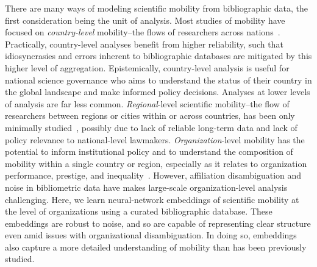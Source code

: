 \documentclass[12pt]{article} %
\begin{document}
There are many ways of modeling scientific mobility from bibliographic data, the first consideration being the unit of analysis. 
Most studies of mobility have focused on \textit{country-level} mobility--the flows of researchers across nations~\autocite{sugimoto2017mostimpact, scellato2015migrant, robinson-garcia2018indicators, franzoni2012foreign-born}.
Practically, country-level analyses benefit from higher reliability, such that idiosyncrasies and errors inherent to bibliographic databases are mitigated by this higher level of aggregation.
Epistemically, country-level analysis is useful for national science governance who aims to understand the status of their country in the global landscape and make informed policy decisions. 
Analyses at lower levels of analysis are far less common. 
\textit{Regional}-level scientific mobility--the flow of researchers between regions or cities within or across countries, has been only minimally studied~\autocite{vaccario2019mobility}, possibly due to lack of reliable long-term data and lack of policy relevance to national-level lawmakers. 
\textit{Organization}-level mobility has the potential to inform institutional policy and to understand the composition of mobility within a single country or region, especially as it relates to organization performance, prestige, and inequality~\autocite{albarran2017topeconomic, deville2014career, morgan2018prestige, clauset2015hierarchy}.
However, affiliation disambiguation and noise in bibliometric data have makes large-scale organization-level analysis challenging.
Here, we learn neural-network embeddings of scientific mobility at the level of organizations using a curated bibliographic database.
These embeddings are robust to noise, and so are capable of representing clear structure even amid issues with organizational disambiguation. 
In doing so, embeddings also capture a more detailed understanding of mobility than has been previously studied. 
\end{document}
